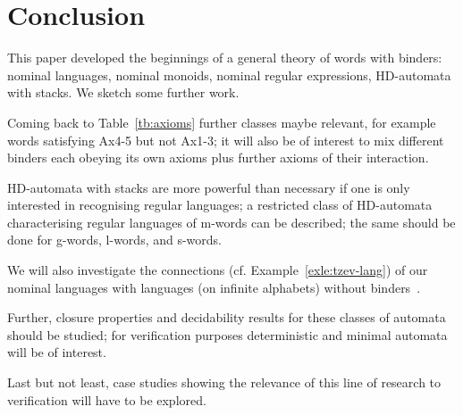 \documentclass[runningheads,a4paper]{llncs}
\begin{document}
\section{Conclusion}

This paper developed the beginnings of a general theory of words with
binders: nominal languages, nominal monoids, nominal regular
expressions, HD-automata with stacks. We sketch some further work.

Coming back to Table~\ref{tb:axioms} further classes maybe relevant,
for example words satisfying Ax4-5 but not Ax1-3; it will also be of
interest to mix different binders each obeying its own axioms plus
further axioms of their interaction.

HD-automata with stacks are more powerful than necessary if one is
only interested in recognising regular languages; a restricted class
of HD-automata characterising regular languages of m-words can be
described; the same should be done for g-words, l-words, and s-words.

We will also investigate the connections (cf.
Example~\ref{exle:tzev-lang}) of our nominal languages with languages
(on infinite alphabets) without binders~\cite{bojanczyk:stacs11,tze11,gabbayciancia,ct09}.


Further, closure properties and decidability results for these classes
of automata should be studied; for verification purposes deterministic
and minimal automata will be of interest. 

Last but not least, case studies showing the relevance of this line of
research to verification will have to be explored.
\end{document}
